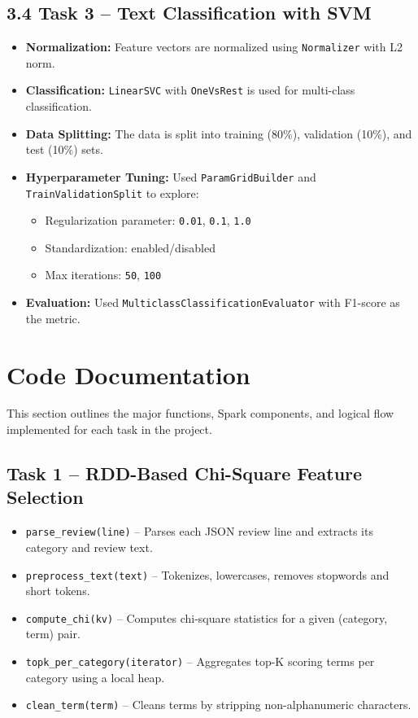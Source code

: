\documentclass[12pt]{article}
\begin{document}
\subsection*{3.4 Task 3 – Text Classification with SVM}

\begin{itemize}
  \item \textbf{Normalization:} Feature vectors are normalized using \texttt{Normalizer} with L2 norm.
  \item \textbf{Classification:} \texttt{LinearSVC} with \texttt{OneVsRest} is used for multi-class classification.
  \item \textbf{Data Splitting:} The data is split into training (80\%), validation (10\%), and test (10\%) sets.
  \item \textbf{Hyperparameter Tuning:} Used \texttt{ParamGridBuilder} and \texttt{TrainValidationSplit} to explore:
    \begin{itemize}
      \item Regularization parameter: \texttt{0.01}, \texttt{0.1}, \texttt{1.0}
      \item Standardization: enabled/disabled
      \item Max iterations: \texttt{50}, \texttt{100}
    \end{itemize}
  \item \textbf{Evaluation:} Used \texttt{MulticlassClassificationEvaluator} with F1-score as the metric.
\end{itemize}



\section{Code Documentation}

This section outlines the major functions, Spark components, and logical flow implemented for each task in the project.

\subsection*{Task 1 – RDD-Based Chi-Square Feature Selection}
\begin{itemize}
  \item \texttt{parse\_review(line)} – Parses each JSON review line and extracts its category and review text.
  \item \texttt{preprocess\_text(text)} – Tokenizes, lowercases, removes stopwords and short tokens.
  \item \texttt{compute\_chi(kv)} – Computes chi-square statistics for a given (category, term) pair.
  \item \texttt{topk\_per\_category(iterator)} – Aggregates top-K scoring terms per category using a local heap.
  \item \texttt{clean\_term(term)} – Cleans terms by stripping non-alphanumeric characters.
\end{itemize}
\end{document}
